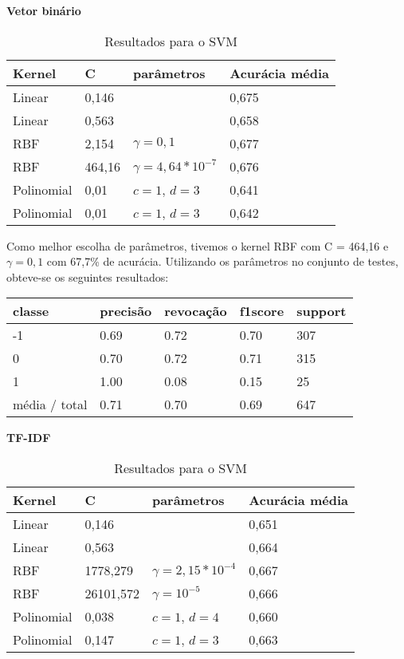 \textbf{Vetor binário}

\begin{table}[H]
	\centering
	\caption{Resultados para o SVM}
	\begin{tabular}{l l l l}
		\hline
		Kernel & C & parâmetros & Acurácia média \\
		\hline
		Linear & 0,146 & & 0,675 \\
		\hline
		Linear & 0,563 & & 0,658 \\
		\hline
		RBF & 2,154 & $\gamma = 0,1$ & 0,677 \\
		\hline
		RBF & 464,16 & $\gamma = 4,64*10^{-7}$ & 0,676 \\
		\hline
		Polinomial & 0,01 & $c = 1$, $d = 3$ & 0,641 \\
		\hline
		Polinomial & 0,01 & $c = 1$, $d = 3$ & 0,642 \\
		\hline
	\end{tabular}
\end{table}

Como melhor escolha de parâmetros, tivemos o kernel RBF com C = 464,16 e $\gamma = 0,1$ com
67,7\% de acurácia. Utilizando os parâmetros no conjunto de testes, obteve-se os seguintes
resultados:

\begin{table}[H]
	\centering
	\begin{tabular}{l | l | l | l | l}
		\hline
		classe  	&	precisão  &  revocação &  f1\-score &  support \\
		\hline
         -1   &    0.69  &    0.72   &   0.70   &    307 \\
         \hline
          0   &    0.70   &   0.72   &   0.71    &   315 \\
          \hline
          1   &    1.00   &   0.08   &   0.15    &    25 \\
		\hline
		média / total   &    0.71   &   0.70   &   0.69   &    647 \\
		\hline
	\end{tabular}
\end{table}

\textbf{TF-IDF}

\begin{table}[H]
	\centering
	\caption{Resultados para o SVM}
	\begin{tabular}{l l l l}
		\hline
		Kernel & C & parâmetros & Acurácia média \\
		\hline
		Linear & 0,146 & & 0,651 \\
		\hline
		Linear & 0,563 & & 0,664 \\
		\hline
		RBF & 1778,279 & $\gamma = 2,15*10^{-4}$ & 0,667 \\
		\hline
		RBF & 26101,572 & $\gamma = 10^{-5}$ & 0,666 \\
		\hline
		Polinomial & 0,038 & $c = 1$, $d = 4$ & 0,660 \\
		\hline
		Polinomial & 0,147 & $c = 1$, $d = 3$ & 0,663 \\
		\hline
	\end{tabular}
\end{table}

